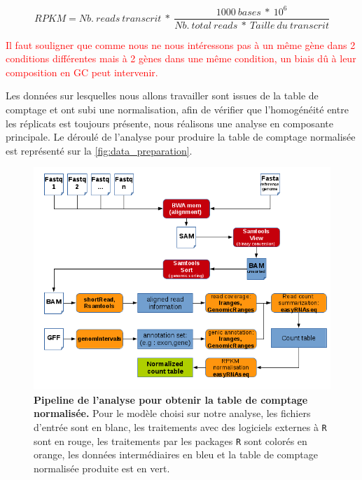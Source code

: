 \documentclass[12pt,a4paper]{report}
\begin{document}
\begin{onehalfspace}
\[RPKM = Nb.~reads~transcrit~*~\frac{1000~bases~*~10^6}{Nb.~total~reads~*~Taille~du~transcrit}\]

\textcolor{red}{Il faut souligner que comme nous ne nous intéressons pas à un même gène dans 2 conditions différentes mais à 2 gènes dans une même condition, un biais dû à leur composition en GC peut intervenir.}

Les données sur lesquelles nous allons travailler sont issues de la table de comptage et ont subi une normalisation, afin de vérifier que l'homogénéité entre les réplicats est toujours présente, nous réalisons une analyse en composante principale. Le déroulé de l'analyse pour produire la table de comptage normalisée est représenté sur la \autoref{fig:data_preparation}.

\begin{figure}[h!]
\centerline{\includegraphics[scale=0.9]{figures/data_preparation.png}}
\caption{\textbf{Pipeline de l'analyse pour obtenir la table de comptage normalisée.} Pour le modèle choisi sur notre analyse, les fichiers d'entrée sont en blanc, les traitements avec des logiciels externes à \texttt{R} sont en rouge, les traitements par les packages \texttt{R} sont colorés en orange, les données intermédiaires en bleu et la table de comptage normalisée produite est en vert.}
\label{fig:data_preparation} 
\end{figure}


\end{onehalfspace}
\end{document}
